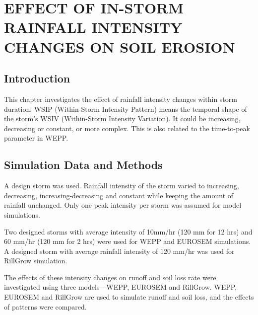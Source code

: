 \chapter{EFFECT OF IN-STORM RAINFALL INTENSITY CHANGES ON SOIL EROSION}
\label{sec:EFFECTSOFRAINFALLINTENSITYCHANGESONSOILEROSION}

\section{Introduction}
\label{sec:IntensiyPatternsIntroduction}
This chapter investigates the effect of rainfall intensity changes within
storm duration. WSIP (Within-Storm Intensity Pattern) means the temporal shape
of the storm's WSIV (Within-Storm Intensity Variation). It could be increasing,
decreasing or constant, or more complex. This is also related to the
time-to-peak parameter in WEPP.

\section{Simulation Data and Methods}
\label{sec:IntensiyPatternsMethods}


A design storm was used. Rainfall intensity of the storm varied
to increasing, decreasing, increasing-decreasing and constant while keeping the
amount of rainfall unchanged.
Only one peak intensity per storm was assumed for model simulations.

Two designed storms with average intensity of 10mm/hr (120 mm for 12 hrs)
and 60 mm/hr (120 mm for 2 hrs) were used for WEPP and EUROSEM simulations.
A designed storm with average rainfall intensity of 120 mm/hr was used for
RillGrow simulation.

The effects of these intensity changes on runoff and soil loss rate were
investigated using three models---WEPP, EUROSEM and RillGrow.
WEPP, EUROSEM and RillGrow are used to simulate runoff and soil loss, and
the effects of patterns were compared.

